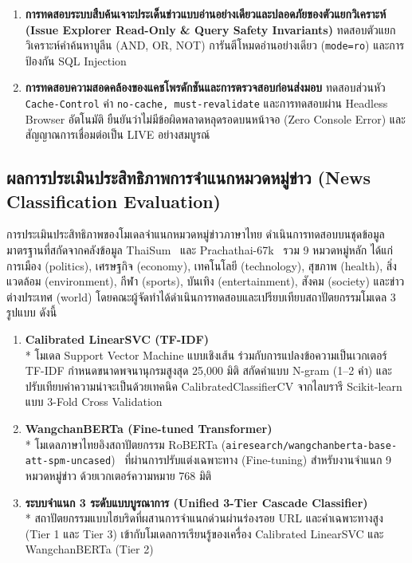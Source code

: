 \begin{enumerate}
    ทดสอบกลไกสำรองการประมวลผลหลักฐาน (Heuristic Fallback) และการตรวจสอบรหัสอ้างอิงรายประโยค (Citation Audit) พร้อมระบบแคชลายนิ้วมือ SHA-256
    \item \textbf{การทดสอบระบบสืบค้นเจาะประเด็นข่าวแบบอ่านอย่างเดียวและปลอดภัยของตัวแยกวิเคราะห์ (Issue Explorer Read-Only \& Query Safety Invariants)}\newline
    ทดสอบตัวแยกวิเคราะห์คำค้นหาบูลีน (AND, OR, NOT) การันตีโหมดอ่านอย่างเดียว (\texttt{mode=ro}) และการป้องกัน SQL Injection
    \item \textbf{การทดสอบความสอดคล้องของแคชโพรดักชันและการตรวจสอบก่อนส่งมอบ}\newline
    ทดสอบส่วนหัว \texttt{Cache-Control} ค่า \texttt{no-cache, must-revalidate} และการทดสอบผ่าน Headless Browser อัตโนมัติ ยืนยันว่าไม่มีข้อผิดพลาดหลุดรอดบนหน้าจอ (Zero Console Error) และสัญญาณการเชื่อมต่อเป็น LIVE อย่างสมบูรณ์
\end{enumerate}

\subsection{ผลการประเมินประสิทธิภาพการจำแนกหมวดหมู่ข่าว (News Classification Evaluation)}

การประเมินประสิทธิภาพของโมเดลจำแนกหมวดหมู่ข่าวภาษาไทย ดำเนินการทดสอบบนชุดข้อมูลมาตรฐานที่สกัดจากคลังข้อมูล ThaiSum~\parencite{chumpolsathien2020thaisum} และ Prachathai-67k~\parencite{prachathai67k} รวม 9 หมวดหมู่หลัก ได้แก่ การเมือง (politics), เศรษฐกิจ (economy), เทคโนโลยี (technology), สุขภาพ (health), สิ่งแวดล้อม (environment), กีฬา (sports), บันเทิง (entertainment), สังคม (society) และข่าวต่างประเทศ (world) โดยคณะผู้จัดทำได้ดำเนินการทดสอบและเปรียบเทียบสถาปัตยกรรมโมเดล 3 รูปแบบ ดังนี้
\begin{enumerate}
    \item \textbf{Calibrated LinearSVC (TF-IDF)}\\*
    โมเดล Support Vector Machine แบบเชิงเส้น ร่วมกับการแปลงข้อความเป็นเวกเตอร์ TF-IDF กำหนดขนาดพจนานุกรมสูงสุด 25,000 มิติ สกัดคำแบบ N-gram (1--2 คำ) และปรับเทียบค่าความน่าจะเป็นด้วยเทคนิค CalibratedClassifierCV จากไลบรารี Scikit-learn~\parencite{scikit2024} แบบ 3-Fold Cross Validation
    \item \textbf{WangchanBERTa (Fine-tuned Transformer)}\\*
    โมเดลภาษาไทยอิงสถาปัตยกรรม RoBERTa (\texttt{airesearch/wangchanberta-base-att-spm-uncased})~\parencite{wangchanberta2021} ที่ผ่านการปรับแต่งเฉพาะทาง (Fine-tuning) สำหรับงานจำแนก 9 หมวดหมู่ข่าว ด้วยเวกเตอร์ความหมาย 768 มิติ
    \item \textbf{ระบบจำแนก 3 ระดับแบบบูรณาการ (Unified 3-Tier Cascade Classifier)}\\*
    สถาปัตยกรรมแบบไฮบริดที่ผสานการจำแนกด่วนผ่านร่องรอย URL และคำเฉพาะทางสูง (Tier 1 และ Tier 3) เข้ากับโมเดลการเรียนรู้ของเครื่อง Calibrated LinearSVC และ WangchanBERTa (Tier 2)
\end{enumerate}


